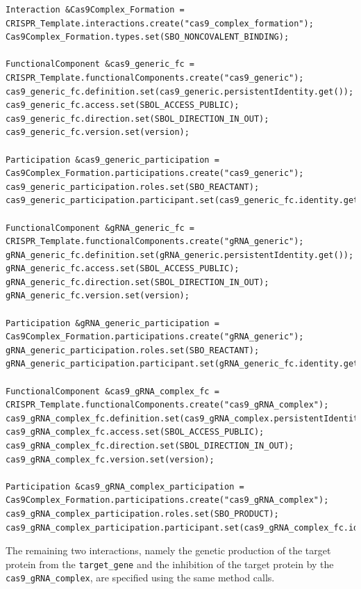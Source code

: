\vspace{\abovedisplayskip}
\begin{minipage}{0.95\textwidth}%
\begin{lstlisting}
Interaction &Cas9Complex_Formation = CRISPR_Template.interactions.create("cas9_complex_formation");
Cas9Complex_Formation.types.set(SBO_NONCOVALENT_BINDING);

FunctionalComponent &cas9_generic_fc = CRISPR_Template.functionalComponents.create("cas9_generic");
cas9_generic_fc.definition.set(cas9_generic.persistentIdentity.get());
cas9_generic_fc.access.set(SBOL_ACCESS_PUBLIC);
cas9_generic_fc.direction.set(SBOL_DIRECTION_IN_OUT);
cas9_generic_fc.version.set(version);

Participation &cas9_generic_participation = Cas9Complex_Formation.participations.create("cas9_generic");
cas9_generic_participation.roles.set(SBO_REACTANT);
cas9_generic_participation.participant.set(cas9_generic_fc.identity.get());

FunctionalComponent &gRNA_generic_fc = CRISPR_Template.functionalComponents.create("gRNA_generic");
gRNA_generic_fc.definition.set(gRNA_generic.persistentIdentity.get());
gRNA_generic_fc.access.set(SBOL_ACCESS_PUBLIC);
gRNA_generic_fc.direction.set(SBOL_DIRECTION_IN_OUT);
gRNA_generic_fc.version.set(version);

Participation &gRNA_generic_participation = Cas9Complex_Formation.participations.create("gRNA_generic"); 
gRNA_generic_participation.roles.set(SBO_REACTANT);
gRNA_generic_participation.participant.set(gRNA_generic_fc.identity.get());

FunctionalComponent &cas9_gRNA_complex_fc = CRISPR_Template.functionalComponents.create("cas9_gRNA_complex");
cas9_gRNA_complex_fc.definition.set(cas9_gRNA_complex.persistentIdentity.get());
cas9_gRNA_complex_fc.access.set(SBOL_ACCESS_PUBLIC);
cas9_gRNA_complex_fc.direction.set(SBOL_DIRECTION_IN_OUT);
cas9_gRNA_complex_fc.version.set(version);

Participation &cas9_gRNA_complex_participation = Cas9Complex_Formation.participations.create("cas9_gRNA_complex");
cas9_gRNA_complex_participation.roles.set(SBO_PRODUCT);
cas9_gRNA_complex_participation.participant.set(cas9_gRNA_complex_fc.identity.get());
\end{lstlisting}
\end{minipage}

The remaining two interactions, namely the genetic production of the target protein from the \lstinline+target_gene+ and the inhibition of the target protein by the \lstinline+cas9_gRNA_complex+, are specified using the same method calls.

